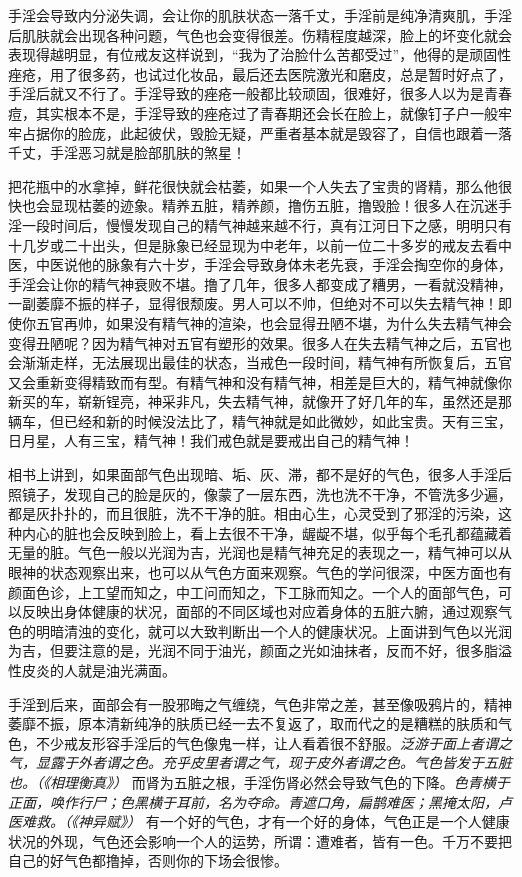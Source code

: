 手淫会导致内分泌失调，会让你的肌肤状态一落千丈，手淫前是纯净清爽肌，手淫后肌肤就会出现各种问题，气色也会变得很差。伤精程度越深，脸上的坏变化就会表现得越明显，有位戒友这样说到，“我为了治脸什么苦都受过”，他得的是顽固性痤疮，用了很多药，也试过化妆品，最后还去医院激光和磨皮，总是暂时好点了，手淫后就又不行了。手淫导致的痤疮一般都比较顽固，很难好，很多人以为是青春痘，其实根本不是，手淫导致的痤疮过了青春期还会长在脸上，就像钉子户一般牢牢占据你的脸庞，此起彼伏，毁脸无疑，严重者基本就是毁容了，自信也跟着一落千丈，手淫恶习就是脸部肌肤的煞星！

把花瓶中的水拿掉，鲜花很快就会枯萎，如果一个人失去了宝贵的肾精，那么他很快也会显现枯萎的迹象。精养五脏，精养颜，撸伤五脏，撸毁脸！很多人在沉迷手淫一段时间后，慢慢发现自己的精气神越来越不行，真有江河日下之感，明明只有十几岁或二十出头，但是脉象已经显现为中老年，以前一位二十多岁的戒友去看中医，中医说他的脉象有六十岁，手淫会导致身体未老先衰，手淫会掏空你的身体，手淫会让你的精气神衰败不堪。撸了几年，很多人都变成了糟男，一看就没精神，一副萎靡不振的样子，显得很颓废。男人可以不帅，但绝对不可以失去精气神！即使你五官再帅，如果没有精气神的渲染，也会显得丑陋不堪，为什么失去精气神会变得丑陋呢？因为精气神对五官有塑形的效果。很多人在失去精气神之后，五官也会渐渐走样，无法展现出最佳的状态，当戒色一段时间，精气神有所恢复后，五官又会重新变得精致而有型。有精气神和没有精气神，相差是巨大的，精气神就像你新买的车，崭新锃亮，神采非凡，失去精气神，就像开了好几年的车，虽然还是那辆车，但已经和新的时候没法比了，精气神就是如此微妙，如此宝贵。天有三宝，日月星，人有三宝，精气神！我们戒色就是要戒出自己的精气神！

相书上讲到，如果面部气色出现暗、垢、灰、滞，都不是好的气色，很多人手淫后照镜子，发现自己的脸是灰的，像蒙了一层东西，洗也洗不干净，不管洗多少遍，都是灰扑扑的，而且很脏，洗不干净的脏。相由心生，心灵受到了邪淫的污染，这种内心的脏也会反映到脸上，看上去很不干净，龌龊不堪，似乎每个毛孔都蕴藏着无量的脏。气色一般以光润为吉，光润也是精气神充足的表现之一，精气神可以从眼神的状态观察出来，也可以从气色方面来观察。气色的学问很深，中医方面也有颜面色诊，上工望而知之，中工问而知之，下工脉而知之。一个人的面部气色，可以反映出身体健康的状况，面部的不同区域也对应着身体的五脏六腑，通过观察气色的明暗清浊的变化，就可以大致判断出一个人的健康状况。上面讲到气色以光润为吉，但要注意的是，光润不同于油光，颜面之光如油抹者，反而不好，很多脂溢性皮炎的人就是油光满面。

手淫到后来，面部会有一股邪晦之气缠绕，气色非常之差，甚至像吸鸦片的，精神萎靡不振，原本清新纯净的肤质已经一去不复返了，取而代之的是糟糕的肤质和气色，不少戒友形容手淫后的气色像鬼一样，让人看着很不舒服。\textit{泛游于面上者谓之气，显露于外者谓之色。充乎皮里者谓之气，现于皮外者谓之色。气色皆发于五脏也。（《相理衡真》）} 而肾为五脏之根，手淫伤肾必然会导致气色的下降。\textit{色青横于正面，唤作行尸；色黑横于耳前，名为夺命。青遮口角，扁鹊难医；黑掩太阳，卢医难救。（《神异赋》）} 有一个好的气色，才有一个好的身体，气色正是一个人健康状况的外现，气色还会影响一个人的运势，所谓：遭难者，皆有一色。千万不要把自己的好气色都撸掉，否则你的下场会很惨。

